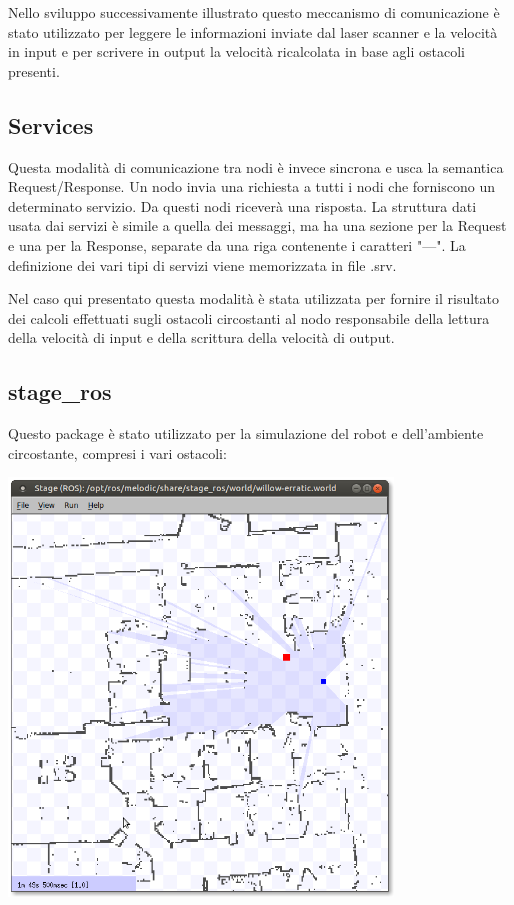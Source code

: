 \documentclass[Lau, binding=0.6cm, oneside]{sapthesis}
\begin{document}
Nello sviluppo successivamente illustrato questo meccanismo di comunicazione è stato utilizzato per leggere le informazioni inviate dal laser scanner e la velocità in input e per scrivere in output la velocità ricalcolata in base agli ostacoli presenti.

\subsection{Services}
Questa modalità di comunicazione tra nodi è invece sincrona e usca la semantica Request/Response.
Un nodo invia una richiesta a tutti i nodi che forniscono un determinato servizio.
Da questi nodi riceverà una risposta.
La struttura dati usata dai servizi è simile a quella dei messaggi, ma ha una sezione per la Request e una per la Response, separate da una riga contenente i caratteri "---".
La definizione dei vari tipi di servizi viene memorizzata in file .srv.

Nel caso qui presentato questa modalità è stata utilizzata per fornire il risultato dei calcoli effettuati sugli ostacoli circostanti al nodo responsabile della lettura della velocità di input e della scrittura della velocità di output.

\subsection{stage\_ros}
Questo package è stato utilizzato per la simulazione del robot e dell'ambiente circostante, compresi i vari ostacoli:

\vspace{1em}
\includegraphics[height=30em]{stage_ros.png}
\end{document}
